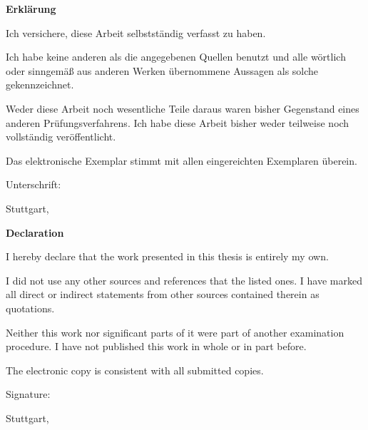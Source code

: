 \thispagestyle{empty}
\begin{Large}
\textbf{Erklärung}
\end{Large}

\vspace{1cm}
Ich versichere, diese Arbeit selbstständig verfasst zu haben.

Ich habe keine anderen als die angegebenen Quellen benutzt und alle wörtlich
oder sinngemäß aus anderen Werken übernommene Aussagen als
solche gekennzeichnet.

Weder diese Arbeit noch wesentliche Teile daraus waren bisher Gegenstand eines
anderen Prüfungsverfahrens. Ich habe diese Arbeit bisher weder teilweise noch
vollständig veröffentlicht.

Das elektronische Exemplar stimmt mit allen eingereichten Exemplaren überein.

\vspace{1cm}
Unterschrift:

\vspace{0.8cm}
\hspace{3cm}Stuttgart, \@date

\vspace*{\fill}

\begin{Large}
\textbf{Declaration}
\end{Large}

\vspace{1cm}
I hereby declare that the work presented in this thesis is entirely my own.

I did not use any other sources and references that the listed ones. I have
marked all direct or indirect statements from other sources contained therein as
quotations.

Neither this work nor significant parts of it were part of another examination
procedure. I have not published this work in whole or in part before.

The electronic copy is consistent with all submitted copies.

\vspace{1cm}
Signature:

\vspace{0.8cm}
\hspace{3cm}Stuttgart, \@date
